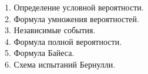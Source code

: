 
1. Определение условной вероятности. \\


2. Формула умножения вероятностей. \\


3. Независимые события. \\


4. Формула полной вероятности. \\


5. Формула Байеса. \\


6. Схема испытаний Бернулли. \\
